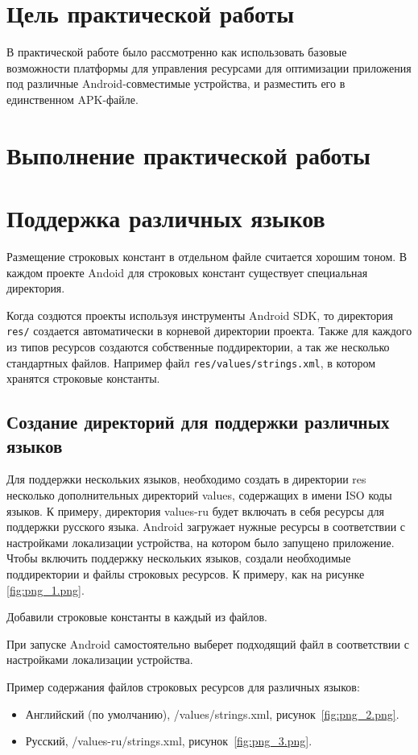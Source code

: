 \graphicspath{{./gall/}}
\section*{\LARGE{Цель практической работы}}
В практической работе было рассмотренно как использовать базовые возможности
платформы для управления ресурсами для оптимизации приложения
под различные Android-совместимые устройства, и разместить его в
единственном APK-файле.

\newpage

\section*{\LARGE{Выполнение практической работы}}

\section{Поддержка различных языков}
Размещение строковых констант в отдельном файле считается хорошим
тоном.
В каждом проекте Andoid для строковых констант существует
специальная директория.\par
Когда создются проекты используя инструменты Android SDK, то
директория \texttt{res/} создается автоматически в корневой директории
проекта.
Также для каждого из типов ресурсов создаются собственные
поддиректории, а так же несколько стандартных файлов.
Например
файл \texttt{res/values/strings.xml}, в котором хранятся строковые константы.

\subsection{Создание директорий для поддержки различных языков}
Для поддержки нескольких языков, необходимо создать в директории res
несколько дополнительных директорий values, содержащих в имени ISO
коды языков.
К примеру, директория values-ru будет включать в себя ресурсы
для поддержки русского языка.
Android загружает нужные ресурсы в соответствии с настройками
локализации устройства, на котором было запущено приложение.
Чтобы включить поддержку нескольких языков, создали
необходимые поддиректории и файлы строковых ресурсов.
К примеру, как
на рисунке \ref{fig:png_1.png}.


Добавили строковые константы в каждый из файлов.\par
При запуске Android самостоятельно выберет подходящий файл в
соответствии с настройками локализации устройства.\par
Пример содержания файлов строковых ресурсов для различных
языков:
\begin{itemize}
	\item Английский (по умолчанию), /values/strings.xml,
		рисунок~\ref{fig:png_2.png}.

	\item Русский, /values-ru/strings.xml,
		рисунок~\ref{fig:png_3.png}.
\end{itemize}


